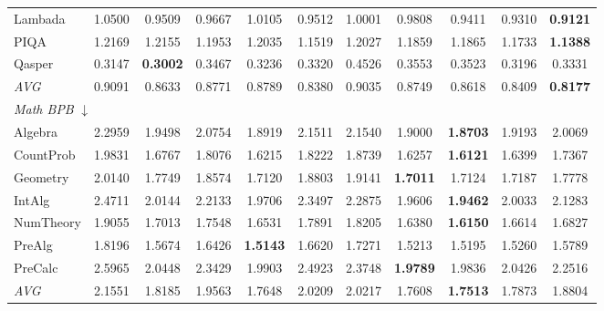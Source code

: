 \begin{table}[htbp]
\begin{tabular}{lcccccccccc}
Lambada & 1.0500 & 0.9509 & 0.9667 & 1.0105 & 0.9512 & 1.0001 & 0.9808 & 0.9411 & 0.9310 & \textbf{0.9121} \\
PIQA & 1.2169 & 1.2155 & 1.1953 & 1.2035 & 1.1519 & 1.2027 & 1.1859 & 1.1865 & 1.1733 & \textbf{1.1388} \\
Qasper & 0.3147 & \textbf{0.3002} & 0.3467 & 0.3236 & 0.3320 & 0.4526 & 0.3553 & 0.3523 & 0.3196 & 0.3331 \\
\textit{AVG} & 0.9091 & 0.8633 & 0.8771 & 0.8789 & 0.8380 & 0.9035 & 0.8749 & 0.8618 & 0.8409 & \textbf{0.8177} \\
\midrule
\multicolumn{11}{l}{\textit{Math BPB} $\downarrow$} \\
Algebra & 2.2959 & 1.9498 & 2.0754 & 1.8919 & 2.1511 & 2.1540 & 1.9000 & \textbf{1.8703} & 1.9193 & 2.0069 \\
CountProb & 1.9831 & 1.6767 & 1.8076 & 1.6215 & 1.8222 & 1.8739 & 1.6257 & \textbf{1.6121} & 1.6399 & 1.7367 \\
Geometry & 2.0140 & 1.7749 & 1.8574 & 1.7120 & 1.8803 & 1.9141 & \textbf{1.7011} & 1.7124 & 1.7187 & 1.7778 \\
IntAlg & 2.4711 & 2.0144 & 2.2133 & 1.9706 & 2.3497 & 2.2875 & 1.9606 & \textbf{1.9462} & 2.0033 & 2.1283 \\
NumTheory & 1.9055 & 1.7013 & 1.7548 & 1.6531 & 1.7891 & 1.8205 & 1.6380 & \textbf{1.6150} & 1.6614 & 1.6827 \\
PreAlg & 1.8196 & 1.5674 & 1.6426 & \textbf{1.5143} & 1.6620 & 1.7271 & 1.5213 & 1.5195 & 1.5260 & 1.5789 \\
PreCalc & 2.5965 & 2.0448 & 2.3429 & 1.9903 & 2.4923 & 2.3748 & \textbf{1.9789} & 1.9836 & 2.0426 & 2.2516 \\
\textit{AVG} & 2.1551 & 1.8185 & 1.9563 & 1.7648 & 2.0209 & 2.0217 & 1.7608 & \textbf{1.7513} & 1.7873 & 1.8804 \\
\bottomrule
\end{tabular}
\end{table}

